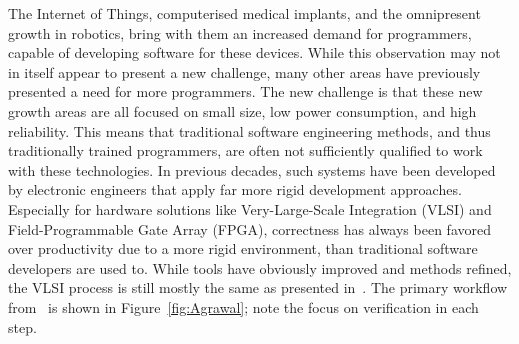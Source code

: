 The Internet of Things, computerised medical implants, and the omnipresent growth in robotics, bring with them an increased demand for programmers, capable of developing software for these devices. While this observation may not in itself appear to present a new challenge, many other areas have previously presented a need for more programmers. The new challenge is that these new growth areas are all focused on small size, low power consumption, and high reliability. This means that traditional software engineering methods, and thus traditionally trained programmers, are often not sufficiently qualified to work with these technologies.
In previous decades, such systems have been developed by electronic engineers that apply far more rigid development approaches. Especially for hardware solutions like Very-Large-Scale Integration (VLSI) and Field-Programmable Gate Array (FPGA), correctness has always been favored over productivity due to a more rigid environment, than traditional software developers are used to.
While tools have obviously improved and methods refined, the VLSI process is still mostly the same as presented in~\cite{Agrawal:1985:VDP:320599.322570}. The primary workflow from~\cite{Agrawal:1985:VDP:320599.322570} is shown in Figure~\ref{fig:Agrawal}; note the focus on verification in each step.\\
